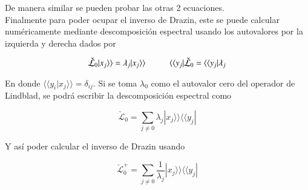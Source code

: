 \begin{appendixs}
De manera similar se pueden probar las otras 2 ecuaciones.\\
 Finalmente para poder ocupar el inverso de Drazin, este se puede calcular numéricamente mediante descomposición espectral usando los autovalores por la izquierda y derecha dados por 

\begin{equation*}
    \check{\mathcal{L}}_{0}|x_{j}\rangle \rangle = \lambda_{j} |x_{j}\rangle \rangle \hspace{10mm}  \langle \langle y_{j}|\check{\mathcal{L}}_{0} = \langle \langle y_{j}|\lambda_{j}
\end{equation*}

En donde $\langle \langle y_{i}|x_{j}\rangle \rangle = \delta_{ij}$. Si se toma $\lambda_{0}$ como el autovalor cero del operador de Lindblad, se podrá escribir la descomposición espectral como

\begin{equation*}
    \check{\mathcal{L}}_{0} = \sum_{j\neq 0}\lambda_{j}|x_{j}\rangle \rangle \langle \langle y_{j}|
\end{equation*}

Y así poder calcular el inverso de Drazin usando

\begin{equation*}
    \check{\mathcal{L}}^{+}_{0} = \sum_{j\neq 0}\frac{1}{\lambda_{j}}|x_{j}\rangle \rangle \langle \langle y_{j}|
\end{equation*}

\label{appendix5drazin}


\end{appendixs}